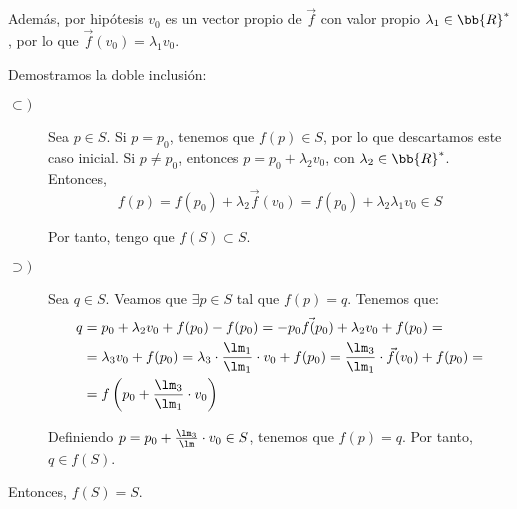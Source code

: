 \begin{ejercicio}
\begin{description}
        Además, por hipótesis $v_0$ es un vector propio de $\vec{f}$ con valor propio $\lambda_1\in \bb{R}^\ast$, por lo que $\vec{f}(v_0) = \lambda_1 v_0$.

        Demostramos la doble inclusión:
        \begin{description}
            \item[$\subset)$] Sea $p\in S$. Si $p=p_0$, tenemos que $f(p)\in S$, por lo que descartamos este caso inicial. Si $p\neq p_0$, entonces $p=p_0+\lambda_2 v_0$, con $\lambda_2 \in \bb{R}^\ast$. Entonces,
            \begin{equation*}
                f(p)=f(p_0) + \lambda_2\vec{f}(v_0) = f(p_0) +\lambda_2 \lambda_1 v_0\in S
            \end{equation*}

            Por tanto, tengo que $f(S)\subset S$.
            
            \item[$\supset)$] Sea $q\in S$. Veamos que $\exists p\in S$ tal que $f(p)=q$. Tenemos que:
            \begin{equation*}
                \begin{split}
                    q &= p_0+\lambda_2 v_0+f(p_0)-f(p_0) = -\vec{p_0f(p_0)} + \lambda_2 v_0 + f(p_0) =\\
                    &= \lambda_3 v_0 + f(p_0)
                    = \lambda_3\cdot \frac{\lm_1}{\lm_1}\cdot   v_0 + f(p_0) 
                    =\frac{\lm_3}{\lm_1}\cdot \vec{f}(v_0) + f(p_0) 
                    =\\&= f\left(p_0 + \frac{\lm_3}{\lm_1}\cdot v_0\right)
                \end{split}
            \end{equation*}

            Definiendo $p=p_0+\frac{\lm_3}{\lm}\cdot v_0\in S$, tenemos que $f(p)=q$. Por tanto, $q\in f(S)$.
        \end{description}

        Entonces, $f(S)=S$.        
    \end{description}
\end{ejercicio}


